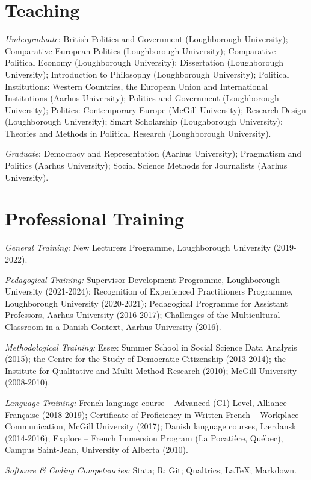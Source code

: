 \documentclass[letterpaper,fontsize=10.5pt]{scrartcl}
\begin{document}
\section{Teaching}
{}\textit{Undergraduate}: British Politics and Government (Loughborough University); Comparative European Politics (Loughborough University); Comparative Political Economy (Loughborough University); Dissertation (Loughborough University); Introduction to Philosophy (Loughborough University); Political Institutions: Western Countries, the European Union and International Institutions (Aarhus University); Politics and Government (Loughborough University); Politics: Contemporary Europe (McGill University); Research Design (Loughborough University); Smart Scholarship (Loughborough University); Theories and Methods in Political Research (Loughborough University).\\
\hfill \break
{}
{}\textit{Graduate}: Democracy and Representation (Aarhus University); Pragmatism and Politics (Aarhus University); Social Science Methods for Journalists (Aarhus University).

\section{Professional Training}
{}\textit{General Training:} New Lecturers Programme, Loughborough University (2019-2022).\\
\hfill \break
{}
{}\textit{Pedagogical Training:} Supervisor Development Programme, Loughborough University (2021-2024); Recognition of Experienced Practitioners Programme, Loughborough University (2020-2021); Pedagogical Programme for Assistant Professors, Aarhus University (2016-2017); Challenges of the Multicultural Classroom in a Danish Context, Aarhus University (2016).\\
\hfill \break
{}
{}\textit{Methodological Training:} Essex Summer School in Social Science Data Analysis (2015); the Centre for the Study of Democratic Citizenship (2013-2014); the Institute for Qualitative and Multi-Method Research (2010); McGill University (2008-2010).\\
\hfill \break
{}
{}\textit{Language Training:} French language course – Advanced (C1) Level, Alliance Française (2018-2019); Certificate of Proficiency in Written French – Workplace Communication, McGill University (2017); Danish language courses, Lærdansk (2014-2016); Explore – French Immersion Program (La Pocatière, Québec), Campus Saint-Jean, University of Alberta (2010).\\
\hfill \break
{}
{}\textit{Software \& Coding Competencies:} Stata; R; Git; Qualtrics; \LaTeX ; Markdown.
\end{document}
